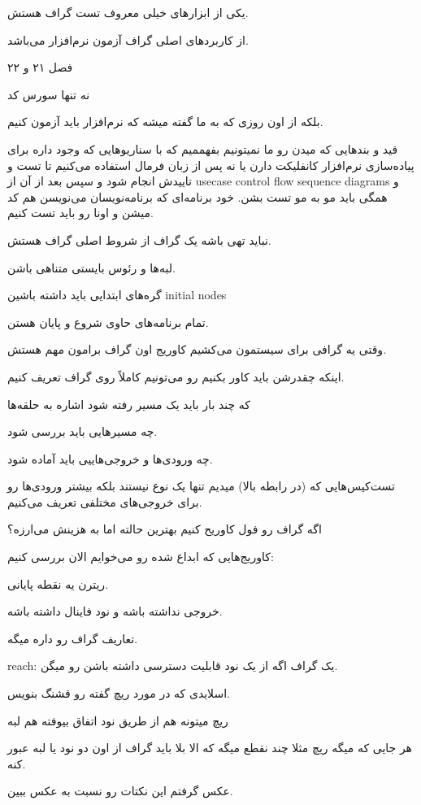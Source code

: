 یکی از ابزار‌های خیلی معروف تست گراف هستش.

از کاربرد‌های اصلی گراف آزمون نرم‌افزار می‌باشد.

فصل ۲۱ و ۲۲

نه تنها سورس کد

بلکه از اون روزی که به ما گفته میشه که نرم‌افزار باید آزمون کنیم.

قید و بند‌هایی که میدن رو ما نمیتونیم بفهممیم که با سناریو‌هایی که وجود داره
برای پیاده‌سازی نرم‌افزار کانفلیکت دارن یا نه پس از زبان فرمال استفاده می‌کنیم
تا تست و تاییدش انجام شود و سپس بعد از آن از usecase control flow sequence
diagrams و همگی باید مو به مو تست بشن. خود برنامه‌ای که برنامه‌نویسان می‌نویسن
هم کد میشن و اونا رو باید تست کنیم.

نباید تهی باشه یک گراف از شروط اصلی گراف هستش.

لبه‌ها و رئوس بایستی متناهی باشن.

گره‌های ابتدایی باید داشته باشین initial nodes

تمام برنامه‌های حاوی شروع و پایان هستن.

وقتی یه گرافی برای سیستمون می‌کشیم کاوریج اون گراف برامون مهم هستش.

اینکه چقدرشن باید کاور بکنیم رو می‌تونیم کاملاً روی گراف تعریف کنیم.

که چند بار باید یک مسیر رفته شود اشاره به حلقه‌ها

چه مسیر‌هایی باید بررسی شود.

چه ورودی‌ها و خروجی‌هاییی باید آماده شود.

تست‌کیس‌هایی که (در رابطه بالا) میدیم تنها یک نوع نیستند بلکه بیشتر ورودی‌ها رو
برای خروجی‌های مختلفی تعریف می‌کنیم.

اگه گراف رو فول کاوریح کنیم بهترین حالته اما به هزینش می‌ارزه؟

کاوریج‌هایی که ابداع شده رو می‌خوایم الان بررسی کنیم:

ریترن یه نقطه پایانی.

خروجی نداشته باشه و نود فاینال داشته باشه.

تعاریف گراف رو داره میگه.

reach: یک گراف اگه از یک نود قابلیت دسترسی داشته باشن رو میگن.

اسلایدی که در مورد ریچ گفته رو قشنگ بنویس.

ریچ میتونه هم از طریق نود اتفاق بیوفته هم لبه

هر جایی که میگه ریچ مثلا چند نقطع میگه که الا بلا باید گراف از اون دو نود یا لبه
عبور کنه.

عکس گرفتم این نکتات رو نسبت به عکس ببین.

